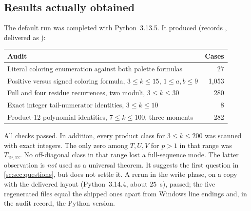 \documentclass[11pt,a4paper]{article}
\numberwithin{equation}{section}
\theoremstyle{definition}
\theoremstyle{remark}
\begin{document}
\subsection{Results actually obtained}
The default run was completed with Python~3.13.5. It produced (records
, delivered as ):
\begin{center}
\small
\begin{tabular}{@{}p{}r@{}}
\toprule
Audit & Cases\\\midrule
Literal coloring enumeration against both palette formulas & 27\\
Positive versus signed coloring formula, $3\le k\le15$, $1\le a,b\le9$ & 1,053\\
Full and four residue recurrences, two moduli, $3\le k\le30$ & 280\\
Exact integer tail-numerator identities, $3\le k\le10$ & 8\\
Product-$12$ polynomial identities, $7\le k\le100$, three moments & 282\\\bottomrule
\end{tabular}
\end{center}
All checks passed. In addition, every product class for $3\le k\le200$
was scanned with exact integers. The only zero among $T,U,V$ for $p>1$
in that range was $T_{19,12}$. No off-diagonal class in that range lost a
full-sequence mode. The latter observation is \emph{not} used as a
universal theorem. It suggests the first question in
\cref{sc:sec:questions}, but does not settle it. A rerun in the write phase, on a copy with the
delivered layout (Python~3.14.4, about $25$~s), passed; the five regenerated
files equal the shipped ones apart from Windows line endings and, in the
audit record, the Python version.
\end{document}
